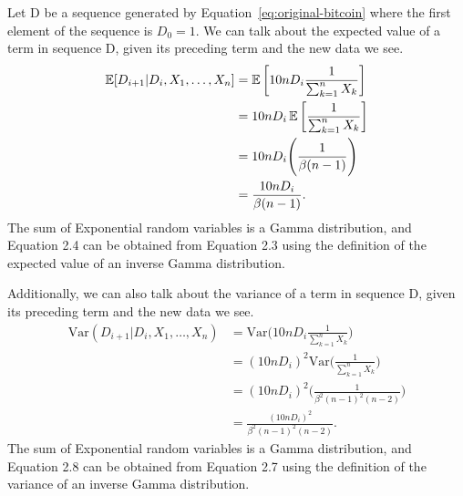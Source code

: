 Let D be a sequence generated by Equation~\ref{eq:original-bitcoin} where the first element of the sequence is $D_0 = 1$. We can talk about the expected value of a term in sequence D, given its preceding term and the new data we see. 
\begin{align}
\operatorname{\mathbb{E}}[D_{i+1} | D_{i}, X_1, \dots, X_{n}] &= \operatorname{\mathbb{E}}\bigg[10n D_i \frac{1}{\sum_{k=1}^{n} X_k}\bigg] \\
&= 10n D_i \operatorname{\mathbb{E}}\bigg[\frac{1}{\sum_{k=1}^{n} X_k}\bigg] \\
&= 10n D_i \Bigg(\frac{1}{\beta(n-1)}\Bigg) \\
&= \frac{10n D_i}{\beta(n-1)}.
\end{align}
The sum of Exponential random variables is a Gamma distribution, and Equation 2.4 can be obtained from Equation 2.3 using the definition of the expected value of an inverse Gamma distribution.

Additionally, we can also talk about the variance of a term in sequence D, given its preceding term and the new data we see. 
\begin{align}
\text{Var}(D_{i+1} | D_{i}, X_1, \dots, X_{n}) &= \text{Var}\bigg(10n D_i \frac{1}{\sum_{k=1}^{n} X_k}\bigg) \\
&= (10n D_i)^2 \text{Var}\bigg(\frac{1}{\sum_{k=1}^{n} X_k}\bigg) \\ 
&= (10n D_i)^2 \Bigg(\frac{1}{\beta^2(n-1)^2(n-2)}\Bigg) \\
&= \frac{(10n D_i)^2}{\beta^2(n-1)^2(n-2)}.
\end{align}
The sum of Exponential random variables is a Gamma distribution, and Equation 2.8 can be obtained from Equation 2.7 using the definition of the variance of an inverse Gamma distribution.

